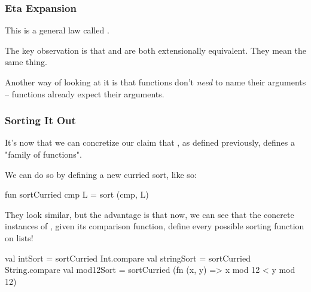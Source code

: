 \documentclass[aspectratio=169, handout]{beamer}
\begin{document}
\begin{frame}[fragile]
  \frametitle{Eta Expansion}

  This is a general law called .

  \pause
  \vspace{\fill}


  \pause
  \vspace{\fill}

  The key observation is that  and  are both
  extensionally equivalent. They mean the same thing.

  \pause
  \vspace{\fill}

  Another way of looking at it is that functions don't \textit{need} to
  name their arguments -- functions already expect their arguments. 
\end{frame}


\begin{frame}[fragile]
  \frametitle{Sorting It Out}

  It's now that we can concretize our claim that , as defined previously,
  defines a "family of functions".

  \pause
  \vspace{\fill}

  We can do so by defining a new curried sort, like so:
  \begin{codeblock}
    fun sortCurried cmp L = sort (cmp, L) 
  \end{codeblock}
  
  \pause
  \vspace{\fill}

  They look similar, but the advantage is that now, we can see that the
  concrete instances of , given its comparison function, define
  every possible sorting function on lists!

  \pause
  \vspace{\fill}

  \begin{codeblock}
    val intSort = sortCurried Int.compare 
    val stringSort = sortCurried String.compare 
    val mod12Sort = 
      sortCurried (fn (x, y) => x mod 12 < y mod 12)
  \end{codeblock}
\end{frame}
\end{document}
